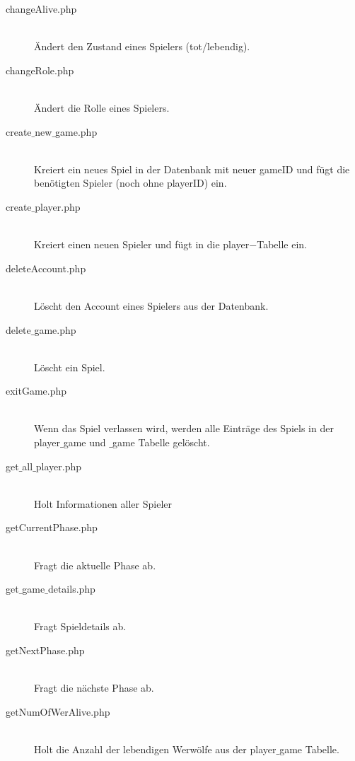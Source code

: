 \documentclass[12pt, a4paper]{article}
\begin{document}
\begin{description}

\item[changeAlive.php]\hfill \\
Ändert den Zustand eines Spielers (tot/lebendig).
	
\item[changeRole.php]\hfill \\
Ändert die Rolle eines Spielers.
	
\item[create$\_$new$\_$game.php]\hfill \\
Kreiert ein neues Spiel in der Datenbank mit neuer gameID und fügt die benötigten Spieler (noch ohne playerID) ein.
	
\item[create$\_$player.php]\hfill \\
Kreiert einen neuen Spieler und fügt in die player$-$Tabelle ein.
	
\item[deleteAccount.php]\hfill \\
Löscht den Account eines Spielers aus der Datenbank.
	
\item[delete$\_$game.php]\hfill \\
Löscht ein Spiel.
	
\item[exitGame.php]\hfill \\
Wenn das Spiel verlassen wird, werden alle Einträge des Spiels in der player$\_$game und $\_$game Tabelle gelöscht.
	
\item[get$\_$all$\_$player.php]\hfill \\
Holt Informationen aller Spieler
	
\item[getCurrentPhase.php]\hfill \\
Fragt die aktuelle Phase ab.

\item[get$\_$game$\_$details.php]\hfill \\
Fragt Spieldetails ab.
	
\item[getNextPhase.php]\hfill \\	
Fragt die nächste Phase ab.
	
\item[getNumOfWerAlive.php]\hfill \\
Holt die Anzahl der lebendigen Werwölfe aus der player$\_$game Tabelle.
	

\end{description}
\end{document}
